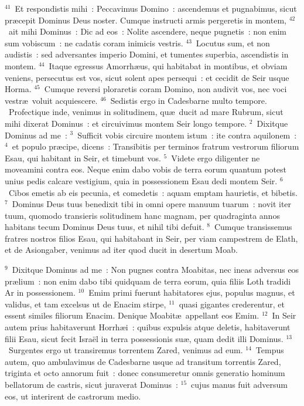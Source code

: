 ${}^{41}$~Et respondistis mihi~: Peccavimus Domino~: ascendemus et pugnabimus, sicut pr\ae cepit Dominus Deus noster. Cumque instructi armis pergeretis in montem,
${}^{42}$~ait mihi Dominus~: Dic ad eos~: Nolite ascendere, neque pugnetis~: non enim sum vobiscum~: ne cadatis coram inimicis vestris.
${}^{43}$~Locutus sum, et non audistis~: sed adversantes imperio Domini, et tumentes superbia, ascendistis in montem.
${}^{44}$~Itaque egressus Amorrh\ae us, qui habitabat in montibus, et obviam veniens, persecutus est vos, sicut solent apes persequi~: et cecidit de Seir usque Horma.
${}^{45}$~Cumque reversi ploraretis coram Domino, non audivit vos, nec voci vestr\ae\ voluit acquiescere.
${}^{46}$~Sedistis ergo in Cadesbarne multo tempore.
~\lettrine[lines=10,image=true,loversize=0.05,lraise=-0.03]{P}{}rofectique inde, venimus in solitudinem, qu\ae\ ducit ad mare Rubrum, sicut mihi dixerat Dominus~: et circuivimus montem Seir longo tempore.
${}^{2}$~Dixitque Dominus ad me~:
${}^{3}$~Sufficit vobis circuire montem istum~: ite contra aquilonem~:
${}^{4}$~et populo pr\ae cipe, dicens~: Transibitis per terminos fratrum vestrorum filiorum Esau, qui habitant in Seir, et timebunt vos.
${}^{5}$~Videte ergo diligenter ne moveamini contra eos. Neque enim dabo vobis de terra eorum quantum potest unius pedis calcare vestigium, quia in possessionem Esau dedi montem Seir.
${}^{6}$~Cibos emetis ab eis pecunia, et comedetis~: aquam emptam haurietis, et bibetis.
${}^{7}$~Dominus Deus tuus benedixit tibi in omni opere manuum tuarum~: novit iter tuum, quomodo transieris solitudinem hanc magnam, per quadraginta annos habitans tecum Dominus Deus tuus, et nihil tibi defuit.
${}^{8}$~Cumque transissemus fratres nostros filios Esau, qui habitabant in Seir, per viam campestrem de Elath, et de Asiongaber, venimus ad iter quod ducit in desertum Moab.


${}^{9}$~Dixitque Dominus ad me~: Non pugnes contra Moabitas, nec ineas adversus eos pr\ae lium~: non enim dabo tibi quidquam de terra eorum, quia filiis Loth tradidi Ar in possessionem.
${}^{10}$~Emim primi fuerunt habitatores ejus, populus magnus, et validus, et tam excelsus ut de Enacim stirpe,
${}^{11}$~quasi gigantes crederentur, et essent similes filiorum Enacim. Denique Moabit\ae\ appellant eos Emim.
${}^{12}$~In Seir autem prius habitaverunt Horrh\ae i~: quibus expulsis atque deletis, habitaverunt filii Esau, sicut fecit Isra\"el in terra possessionis su\ae , quam dedit illi Dominus.
${}^{13}$~Surgentes ergo ut transiremus torrentem Zared, venimus ad eum.
${}^{14}$~Tempus autem, quo ambulavimus de Cadesbarne usque ad transitum torrentis Zared, triginta et octo annorum fuit~: donec consumeretur omnis generatio hominum bellatorum de castris, sicut juraverat Dominus~:
${}^{15}$~cujus manus fuit adversum eos, ut interirent de castrorum medio.


